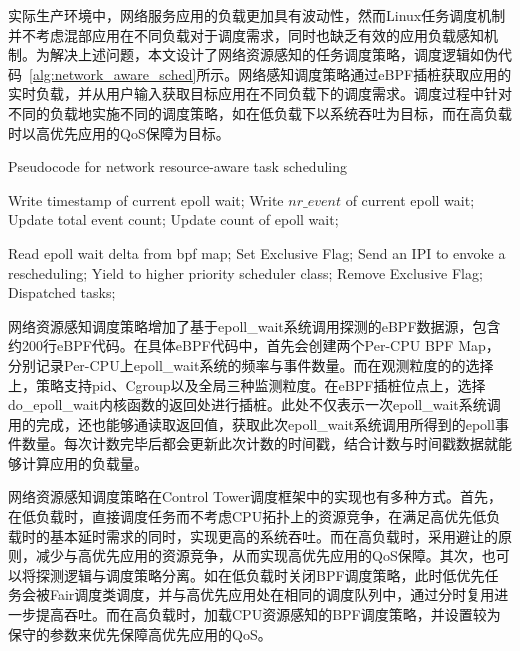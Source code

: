 实际生产环境中，网络服务应用的负载更加具有波动性，然而Linux任务调度机制并不考虑混部应用在不同负载对于调度需求，同时也缺乏有效的应用负载感知机制。为解决上述问题，本文设计了网络资源感知的任务调度策略，调度逻辑如伪代码~\ref{alg:network_aware_sched}所示。网络感知调度策略通过eBPF插桩获取应用的实时负载，并从用户输入获取目标应用在不同负载下的调度需求。调度过程中针对不同的负载地实施不同的调度策略，如在低负载下以系统吞吐为目标，而在高负载时以高优先应用的QoS保障为目标。

\begin{algorithm}[H]
    \caption{Pseudocode for network resource-aware task scheduling}
    \label{alg:network_aware_sched}
    \begin{algorithmic}[1]

        \State Write timestamp of current epoll wait;
        \State Write $nr\_event$ of current epoll wait;
        \State Update total event count;
        \State Update count of epoll wait;
    \EndFunction

            \State Read epoll wait delta from bpf map;
                \State Set Exclusive Flag;
                    \State Send an IPI to envoke a rescheduling;
                \EndFor
                \State Yield to higher priority scheduler class;
            \EndIf
            \State Remove Exclusive Flag;
            \State Dispatched tasks;
        \EndWhile
    \EndFunction
    \end{algorithmic}
\end{algorithm}

网络资源感知调度策略增加了基于epoll\_wait系统调用探测的eBPF数据源，包含约200行eBPF代码。在具体eBPF代码中，首先会创建两个Per-CPU BPF Map，分别记录Per-CPU上epoll\_wait系统的频率与事件数量。而在观测粒度的的选择上，策略支持pid、Cgroup以及全局三种监测粒度。在eBPF插桩位点上，选择do\_epoll\_wait内核函数的返回处进行插桩。此处不仅表示一次epoll\_wait系统调用的完成，还也能够通读取返回值，获取此次epoll\_wait系统调用所得到的epoll事件数量。每次计数完毕后都会更新此次计数的时间戳，结合计数与时间戳数据就能够计算应用的负载量。

网络资源感知调度策略在Control Tower调度框架中的实现也有多种方式。首先，在低负载时，直接调度任务而不考虑CPU拓扑上的资源竞争，在满足高优先低负载时的基本延时需求的同时，实现更高的系统吞吐。而在高负载时，采用避让的原则，减少与高优先应用的资源竞争，从而实现高优先应用的QoS保障。其次，也可以将探测逻辑与调度策略分离。如在低负载时关闭BPF调度策略，此时低优先任务会被Fair调度类调度，并与高优先应用处在相同的调度队列中，通过分时复用进一步提高吞吐。而在高负载时，加载CPU资源感知的BPF调度策略，并设置较为保守的参数来优先保障高优先应用的QoS。

